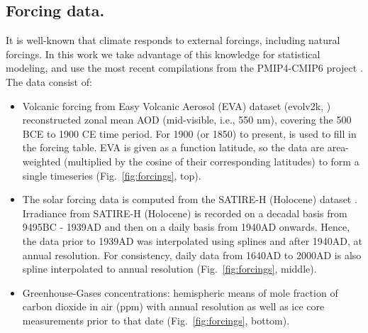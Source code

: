 \documentclass[12pt]{amsart}
\theoremstyle{plain}
\theoremstyle{definition}
\theoremstyle{remark}
\newcommand{\lb}[1]{\color{MidnightBlue}\textbf{[LB: #1]}\normalcolor}
\newcommand{\jeg}[1]{\color{ProcessBlue}\textbf{[JEG: #1]}\normalcolor}
\begin{document}

\subsection{Forcing data.}
It is well-known that climate responds to external forcings, including natural forcings. In this work we take advantage of this knowledge for statistical modeling, and use the most recent compilations from the PMIP4-CMIP6 project \citep{JungclausGMD17,Kageyama_GMD2017}. The data consist of:
\begin{itemize}
\item Volcanic forcing from Easy Volcanic Aerosol (EVA) dataset (evolv2k,
  \cite{Toohey2016}) reconstructed zonal mean AOD (mid-visible, i.e., 550 nm), covering the
  500 BCE to 1900 CE time period. For 1900 (or 1850) to present, \cite{Thomason2016} is
  used to fill in the forcing table. EVA is given as a function latitude, so the data are area-weighted (multiplied by the cosine of their corresponding latitudes) to form a single timeseries (Fig.~\ref{fig:forcings}, top).
  
\item The solar forcing data is computed from the SATIRE-H
  (Holocene) dataset \citep{Vieira2011}. Irradiance from SATIRE-H (Holocene) is
  recorded on a decadal basis from 9495BC - 1939AD and then on a daily basis
  from 1940AD onwards. Hence, the data prior to 1939AD was interpolated using splines and after 1940AD, at annual resolution. For consistency, daily data from 1640AD to 2000AD is also spline interpolated to annual resolution (Fig.~\ref{fig:forcings}, middle). 
\item Greenhouse-Gases concentrations: hemispheric means of mole
  fraction of carbon dioxide in air (ppm) with annual
  resolution \citep{Meinshausen_GMD2017} as well as ice core measurements prior to that date \citep{JungclausGMD17} (Fig.~\ref{fig:forcings}, bottom).
\end{itemize}
\end{document}
